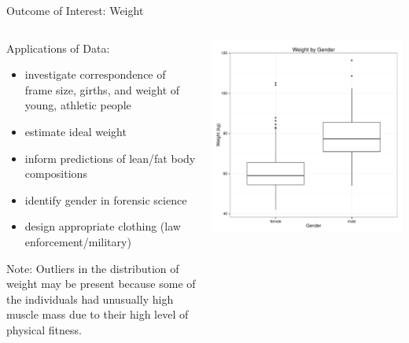 \documentclass[table]{beamer}\usepackage[]{graphicx}\usepackage[]{color}
\makeatletter
\def\maxwidth{ %
  \ifdim\Gin@nat@width>\linewidth
    \linewidth
  \else
    \Gin@nat@width
  \fi
}
\newenvironment{knitrout}{}{} %
\makeatother
\begin{document}
\begin{frame}{Outcome of Interest: Weight}

\begin{columns}[c] %
\begin{column}[c]{5cm} %
{\fontsize{0.275cm}{1em}\selectfont

Applications of Data: 
\begin {itemize}
  \item investigate correspondence of frame size, girths, and weight of young, athletic people
  \item  estimate ideal weight
  \item  inform predictions of lean/fat body compositions
  \item  identify gender in forensic science
  \item  design appropriate clothing (law enforcement/military) 
\end{itemize}

Note: Outliers in the distribution of weight may be present because some of the individuals had unusually high muscle mass due to their high level of physical fitness.

}
\end{column}

\begin{column}[c]{7cm} 
\begin{knitrout}
\color{fgcolor}
\includegraphics[width=\maxwidth]{figure/weight_plot} 

\end{knitrout}

\end{column}
\end{columns}
\end{frame}
\end{document}
